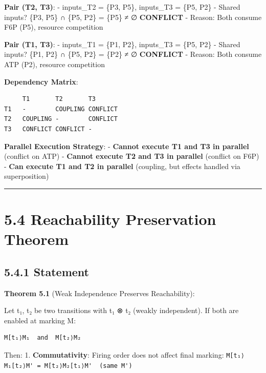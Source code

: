 \textbf{Pair (T2, T3)}: - inputs\_T2 = \{P3, P5\}, inputs\_T3 = \{P5,
P2\} - Shared inputs? \{P3, P5\} ∩ \{P5, P2\} = \{P5\} ≠ ∅ \textrightarrow
\textbf{CONFLICT} - Reason: Both consume F6P (P5), resource competition

\textbf{Pair (T1, T3)}: - inputs\_T1 = \{P1, P2\}, inputs\_T3 = \{P5,
P2\} - Shared inputs? \{P1, P2\} ∩ \{P5, P2\} = \{P2\} ≠ ∅ \textrightarrow
\textbf{CONFLICT} - Reason: Both consume ATP (P2), resource competition

\textbf{Dependency Matrix}:

\begin{lstlisting}
     T1       T2       T3
T1   -        COUPLING CONFLICT
T2   COUPLING -        CONFLICT
T3   CONFLICT CONFLICT -
\end{lstlisting}

\textbf{Parallel Execution Strategy}: - \textbf{Cannot execute T1 and T3
in parallel} (conflict on ATP) - \textbf{Cannot execute T2 and T3 in
parallel} (conflict on F6P) - \textbf{Can execute T1 and T2 in parallel}
(coupling, but effects handled via superposition)

\begin{center}\rule{0.5\linewidth}{0.5pt}\end{center}

\hypertarget{reachability-preservation-theorem}{%
\section{5.4 Reachability Preservation
Theorem}\label{reachability-preservation-theorem}}

\hypertarget{statement}{%
\subsection{5.4.1 Statement}\label{statement}}

\textbf{Theorem 5.1} (Weak Independence Preserves Reachability):

Let t₁, t₂ be two transitions with t₁ ⊗ t₂ (weakly independent). If both
are enabled at marking M:

\begin{lstlisting}
M[t₁⟩M₁  and  M[t₂⟩M₂
\end{lstlisting}

Then: 1. \textbf{Commutativity}: Firing order does not affect final
marking:
\passthrough{\lstinline!M[t₁⟩M₁[t₂⟩M' = M[t₂⟩M₂[t₁⟩M'  (same M')!}

